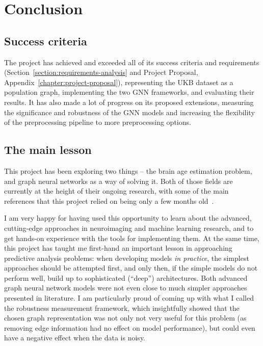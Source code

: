 \chapter{Conclusion}



\section{Success criteria}
The project has achieved and exceeded all of its success criteria and requirements (Section~\ref{section:requirements-analysis} and Project Proposal, Appendix~\ref{chapter:project-proposal}), representing the UKB dataset as a population graph, implementing the two GNN frameworks, and evaluating their results. It has also made a lot of progress on its proposed extensions, measuring the significance and robustness of the GNN models and increasing the flexibility of the preprocessing pipeline to more preprocessing options.

\section{The main lesson}
This project has been exploring two things – the brain age estimation problem, and graph neural networks as a way of solving it. Both of those fields are currently at the height of their ongoing research, with some of the main references that this project relied on being only a few months old~\cite{kaufmann2019, niu2019improved, pervaiz2020optimising}.

I am very happy for having used this opportunity to learn about the advanced, cutting-edge approaches in neuroimaging and machine learning research, and to get hands-on experience with the tools for implementing them. At the same time, this project has taught me first-hand an important lesson in approaching predictive analysis problems: when developing models \textit{in practice}, the simplest approaches should be attempted first, and only then, if the simple models do not perform well, build up to sophisticated (``deep'') architectures. Both advanced graph neural network models were not even close to much simpler approaches presented in literature. I am particularly proud of coming up with what I called the robustness measurement framework, which insightfully showed that the chosen graph representation was not only not very useful for this problem (as removing edge information had no effect on model performance), but could even have a negative effect when the data is noisy.


